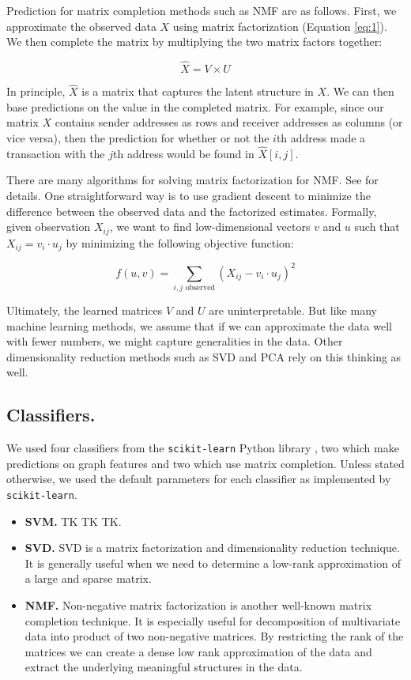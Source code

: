 \documentclass{article} %
\begin{document}
Prediction for matrix completion methods such as NMF are as follows. First, we approximate the observed data $X$ using matrix factorization (Equation \ref{eq:1}). We then complete the matrix by multiplying the two matrix factors together:

$$
\hat{X} = V \times U
$$

In principle, $\hat{X}$ is a matrix that captures the latent structure in $X$. We can then base predictions on the value in the completed matrix. For example, since our matrix $X$ contains sender addresses as rows and receiver addresses as columns (or vice versa), then the prediction for whether or not the $i$th address made a transaction with the $j$th address would be found in $\hat{X}[i, j]$.

There are many algorithms for solving matrix factorization for NMF. See \cite{lee2001algorithms} for details. One straightforward way is to use gradient descent to minimize the difference between the observed data and the factorized estimates. Formally, given observation $X_{ij}$, we want to find low-dimensional vectors $v$ and $u$ such that $X_{ij} = v_i \cdot  u_j$ by minimizing the following objective function:

$$
f(u, v) = \sum_{i,j \text{ observed}} (X_{ij} - v_i \cdot u_j)^2
$$

Ultimately, the learned matrices $V$ and $U$ are uninterpretable. But like many machine learning methods, we assume that if we can approximate the data well with fewer numbers, we might capture generalities in the data. Other dimensionality reduction methods such as SVD and PCA rely on this thinking as well.

\subsection{Classifiers.}

We used four classifiers from the \texttt{scikit-learn} Python library \cite{scikit-learn}, two which make predictions on graph features and two which use matrix completion. Unless stated otherwise, we used the default parameters for each classifier as implemented by \texttt{scikit-learn}.

\begin{itemize}

\item \textbf{SVM.} TK TK TK.

\item \textbf{SVD.} SVD is a matrix factorization and dimensionality reduction technique. It is generally useful when we need to determine a low-rank approximation of a large and sparse matrix.     

\item \textbf{NMF.} Non-negative matrix factorization is another well-known matrix completion technique. It is especially useful for decomposition of multivariate data into product of two non-negative matrices. By restricting the rank of the matrices we can create a dense low rank approximation of the data and extract the underlying meaningful structures in the data.

\end{itemize}
\end{document}
